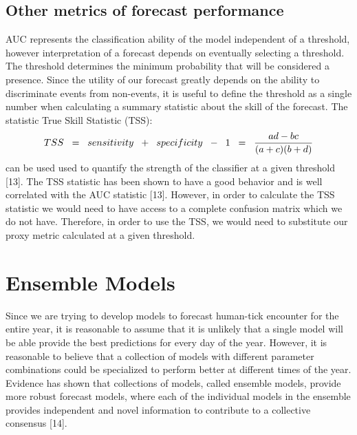 \subsection{Other metrics of forecast performance}
\noindent AUC represents the classification ability of the model independent of a threshold, however interpretation of a forecast depends on eventually selecting a threshold. The threshold determines the minimum probability that will be considered a presence. Since the utility of our forecast greatly depends on the ability to discriminate events from non-events, it is useful to define the threshold as a single number when calculating a summary statistic about the skill of the forecast. The statistic True Skill Statistic (TSS):
\begin{equation}
TSS \hspace{0.2cm} = \hspace{0.2cm} sensitivity \hspace{0.2cm} + \hspace{0.2cm} specificity\hspace{0.2cm}  -\hspace{0.2cm} 1 \hspace{0.2cm} =  \hspace{0.2cm} \frac{ad -bc}{(a+c)(b+d)}
\end{equation}
can be used used to quantify the strength of the classifier at a given threshold [13]. The TSS statistic has been shown to have a good behavior and is well correlated with the AUC statistic [13]. However, in order to calculate the TSS statistic we would need to have access to a complete confusion matrix which we do not have. Therefore, in order to use the TSS, we would need to substitute our proxy metric calculated at a given threshold. \newline




\section{Ensemble Models}

Since we are trying to develop models to forecast human-tick encounter for the entire year, it is reasonable to assume that it is unlikely that a single model will be able provide the best predictions for every day of the year. However, it is reasonable to believe that a collection of models with different parameter combinations could be specialized to perform better at different times of the year. Evidence has shown that collections of models, called ensemble models, provide more robust forecast models, where each of the individual models in the ensemble provides independent and novel information to contribute to a collective consensus [14]. \newline

